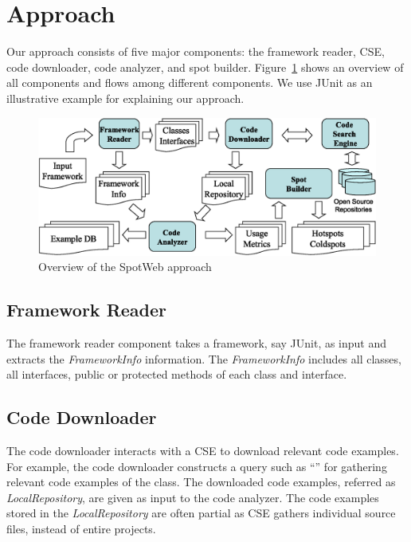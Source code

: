 \section{Approach}
\label{sec:specapproach}
Our approach consists of five major components:
the framework reader, CSE, code downloader, code
analyzer, and spot builder. Figure~\ref{fig:architecture} shows an overview of all components
and flows among different components. We use JUnit
as an illustrative example for explaining our approach. 
\begin{figure}[t]
\centering
\includegraphics[scale=0.38,clip]{Framework_overview1.eps}
\caption{Overview of the SpotWeb approach} \label{fig:architecture}
\end{figure}
\subsection{Framework Reader} 
The framework reader component
takes a framework, say JUnit, as input and extracts the \emph{FrameworkInfo}
information. The \emph{FrameworkInfo} includes all classes, all interfaces, public
or protected methods of each class and interface.
\subsection{Code Downloader} 
The code downloader interacts with a CSE to download relevant code examples. 
For example, the code downloader constructs
a query such as ``'' for
gathering relevant code examples of the  class.
The downloaded code examples, referred as \emph{LocalRepository}, are given as input
to the code analyzer. The code examples stored in the \emph{LocalRepository}
are often partial as CSE gathers individual source files,
instead of entire projects. 

